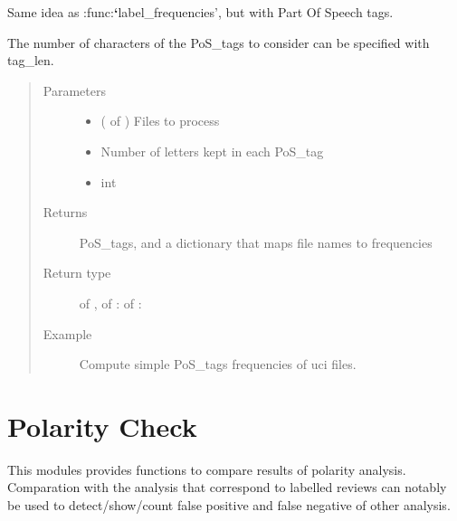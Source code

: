 \documentclass[letterpaper,10pt,english]{sphinxmanual}
\begin{document}
\begin{fulllineitems}
\label{\detokenize{analysis:loacore.analysis.frequencies.pos_tag_frequencies}}
Same idea as :func:{\color{red}\bfseries{}{}`}label\_frequencies’, but with Part Of Speech tags.

The number of characters of the PoS\_tags to consider can be specified with tag\_len.
\begin{quote}\begin{description}
\item[{Parameters}] \leavevmode\begin{itemize}
\item {} 
 ( of ) \textendash{} Files to process

\item {} 
 \textendash{} Number of letters kept in each PoS\_tag

\item {} 
 \textendash{} int

\end{itemize}

\item[{Returns}] \leavevmode
PoS\_tags, and a dictionary that maps file names to frequencies

\item[{Return type}] \leavevmode
{} of  ,  of  :  of  : 

\item[{Example}] \leavevmode
Compute simple PoS\_tags frequencies of uci files.

\end{description}\end{quote}

\end{fulllineitems}



\section{Polarity Check}
\label{\detokenize{analysis:polarity-check}}
This modules provides functions to compare results of polarity analysis. Comparation with the analysis that correspond to labelled reviews can notably be used to detect/show/count false positive and false negative of other analysis.
\end{document}
